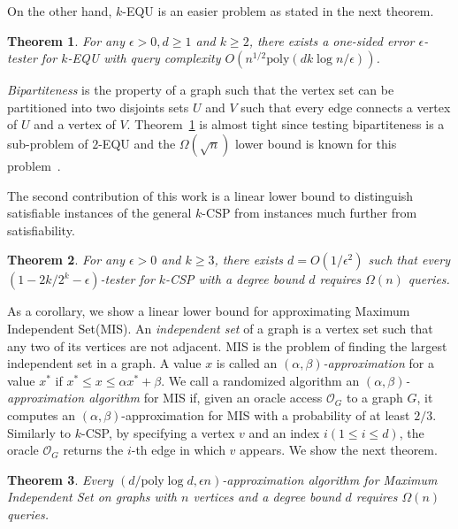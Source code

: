 \documentclass[letterpaper,11pt]{article}
\newtheorem{theorem}{Theorem}[section]
\newcommand{\poly}{\mathrm{poly}}
\newcommand{\calo}{\mathcal{O}}
\newcommand{\mislong}{\textsf{Maximum Independent Set}\xspace}
\newcommand{\mis}{\textsf{MIS}\xspace}
\newcommand{\kcsp}{\textsf{$k$-CSP}\xspace}
\newcommand{\equ}{\textsf{EQU}\xspace}
\newcommand{\kequ}{$k$-\textsf{EQU}\xspace}
\begin{document}
On the other hand,
\kequ is an easier problem as stated in the next theorem.
\begin{theorem}\label{thr:equ}
  For any $\epsilon>0,d\geq 1$ and $k\geq 2$,
  there exists a one-sided error $\epsilon$-tester for \kequ with query complexity $O(n^{1/2}\poly(dk\log n/\epsilon))$.
\end{theorem}
\textit{Bipartiteness} is the property of a graph such that the vertex set can be partitioned into two disjoints sets $U$ and $V$ such that every edge connects a vertex of $U$ and a vertex of $V$.
Theorem~\ref{thr:equ} is almost tight since testing bipartiteness is a sub-problem of $2$-\equ and the $\Omega(\sqrt{n})$ lower bound is known for this problem~\cite{GR08}.

The second contribution of this work is a linear lower bound to distinguish satisfiable instances of the general \kcsp from instances much further from satisfiability.
\begin{theorem}\label{thr:kcsp}
  For any $\epsilon>0$ and $k\geq 3$, 
  there exists $d=O(1/\epsilon^2)$ such that 
  every $(1-2k/2^k-\epsilon)$-tester for \kcsp with a degree bound $d$ requires $\Omega(n)$ queries.
\end{theorem}
As a corollary, we show a linear lower bound for approximating \mislong (\mis).
An {\it independent set} of a graph is a vertex set such that any two of its vertices are not adjacent.
\mis is the problem of finding the largest independent set in a graph.
A value $x$ is called an \textit{$(\alpha,\beta)$-approximation} for a value $x^*$ if $x^*\leq x \leq \alpha x^*+\beta$.
We call a randomized algorithm an \textit{$(\alpha,\beta)$-approximation algorithm} for \mis if,
given an oracle access $\calo_G$ to a graph $G$,
it computes an $(\alpha,\beta)$-approximation for \mis with a probability of at least $2/3$.
Similarly to \kcsp, 
by specifying a vertex $v$ and an index $i(1\leq i \leq d)$,
the oracle $\calo_G$ returns the $i$-th edge in which $v$ appears.
We show the next theorem.
\begin{theorem}\label{thr:mis}
  Every $(d/\poly\log d,\epsilon n)$-approximation algorithm for \mislong on graphs with $n$ vertices and a degree bound $d$ requires $\Omega(n)$ queries.
\end{theorem}
\end{document}
